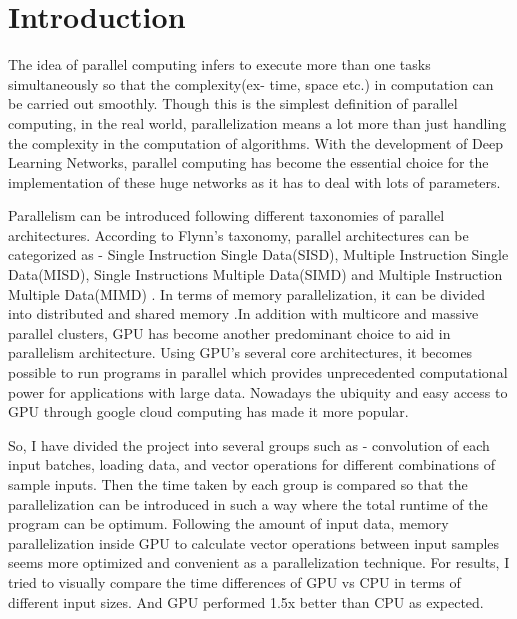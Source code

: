 \documentclass[11pt]{article}       %
\begin{document}
\section{Introduction} \label{intro}
The idea of parallel computing infers to execute more than one tasks simultaneously so that the complexity(ex- time, space etc.) in computation can be carried out smoothly. Though this is the simplest definition of parallel computing, in the real world, parallelization means a lot more than just handling the complexity in the computation of algorithms. With the development of Deep Learning Networks, parallel computing has become the essential choice for the implementation of these huge networks as it has to deal with lots of parameters.\newline

Parallelism can be introduced following different taxonomies of parallel architectures. According to Flynn's taxonomy, parallel architectures can be categorized as - Single Instruction Single Data(SISD), Multiple Instruction Single Data(MISD), Single Instructions Multiple Data(SIMD) and Multiple Instruction Multiple Data(MIMD) \cite{dr9}. In terms of memory parallelization, it can be divided into distributed and shared memory \cite{book1}.In addition with multicore and massive parallel clusters, GPU has become another predominant choice to aid in parallelism architecture. Using GPU's several core architectures, it becomes possible to run programs in parallel which provides unprecedented computational power for applications with large data. Nowadays the ubiquity and easy access to GPU through google cloud computing \cite{mis1} has made it more popular.\newline

So, I have divided the project into several groups such as - convolution of each input batches, loading data, and vector operations for different combinations of sample inputs. Then the time taken by each group is compared so that the parallelization can be introduced in such a way where the total runtime of the program can be optimum. Following the amount of input data, memory parallelization inside GPU to calculate vector operations between input samples seems more optimized and convenient as a parallelization technique.
For results, I tried to visually compare the time differences of GPU vs CPU in terms of different input sizes. And GPU performed 1.5x better than CPU as expected.\newline
\end{document}
